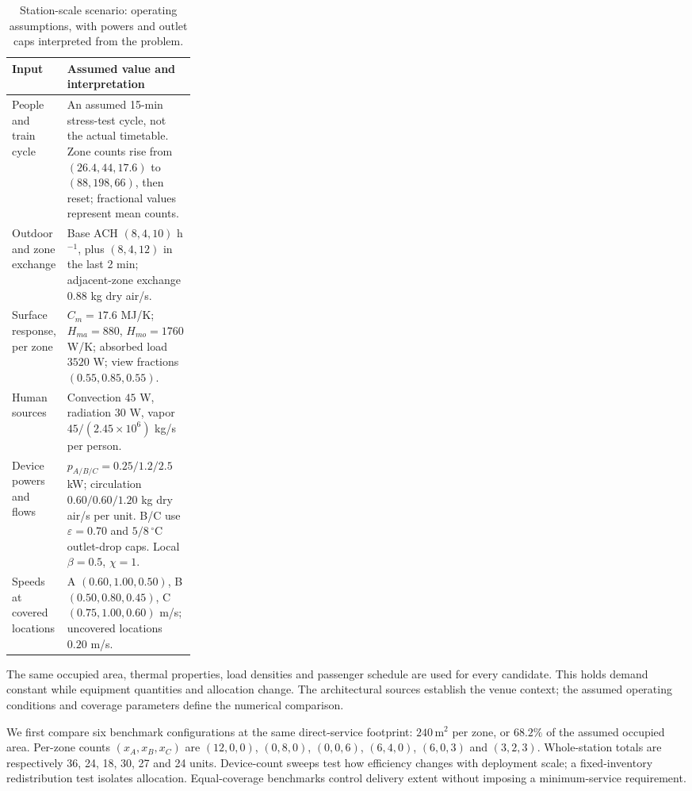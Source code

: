 \begin{table}[!ht]
\centering\small
\caption{Station-scale scenario: operating assumptions, with powers and outlet caps interpreted from the problem.}
\label{tab:rail-inputs}
\begin{tabularx}{\linewidth}{@{}>{\raggedright\arraybackslash}p{0.27\linewidth}>{\raggedright\arraybackslash}X@{}}
\toprule
Input & Assumed value and interpretation\\
\midrule
People and train cycle & An assumed 15-min stress-test cycle, not the actual timetable. Zone counts rise from $(26.4,44,17.6)$ to $(88,198,66)$, then reset; fractional values represent mean counts.\\
Outdoor and zone exchange & Base ACH $(8,4,10)$ h$^{-1}$, plus $(8,4,12)$ in the last 2 min; adjacent-zone exchange $0.88$ kg dry air/s.\\
Surface response, per zone & $C_m=17.6$ MJ/K; $H_{ma}=880$, $H_{mo}=1760$ W/K; absorbed load $3520$ W; view fractions $(0.55,0.85,0.55)$.\\
Human sources & Convection $45$ W, radiation $30$ W, vapor $45/(2.45\times10^6)$ kg/s per person.\\
Device powers and flows & $p_{A/B/C}=0.25/1.2/2.5$ kW; circulation $0.60/0.60/1.20$ kg dry air/s per unit. B/C use $\varepsilon=0.70$ and $5/8\,^{\circ}\mathrm C$ outlet-drop caps. Local $\beta=0.5$, $\chi=1$.\\
Speeds at covered locations & A $(0.60,1.00,0.50)$, B $(0.50,0.80,0.45)$, C $(0.75,1.00,0.60)$ m/s; uncovered locations $0.20$ m/s.\\
\bottomrule
\end{tabularx}
\end{table}

The same occupied area, thermal properties, load densities and passenger schedule are used for every candidate. This holds demand constant while equipment quantities and allocation change. The architectural sources establish the venue context; the assumed operating conditions and coverage parameters define the numerical comparison.

We first compare six benchmark configurations at the same direct-service footprint: $240\,\mathrm{m^2}$ per zone, or $68.2\%$ of the assumed occupied area. Per-zone counts $(x_A,x_B,x_C)$ are $(12,0,0)$, $(0,8,0)$, $(0,0,6)$, $(6,4,0)$, $(6,0,3)$ and $(3,2,3)$. Whole-station totals are respectively 36, 24, 18, 30, 27 and 24 units. Device-count sweeps test how efficiency changes with deployment scale; a fixed-inventory redistribution test isolates allocation. Equal-coverage benchmarks control delivery extent without imposing a minimum-service requirement.

